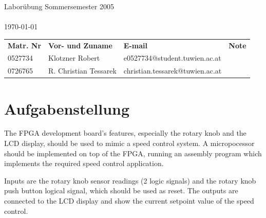 \documentclass[a4paper,10pt]{scrartcl}
\begin{document}
\begin{titlepage}
\begin{center}
\begin{Large}

\sffamily \vspace*{\fill}{Institut f\"ur Computertechnik\\
Labor integrierte Schaltungen\\
384.088\\}
\vfill { Labor\"ubung Sommersemester 2005\\}
\vspace{10mm}{Betreuer: Herr Nachtnebel}\\
\today\\
\end{Large}
\vfill

\begin{tabular}{llll}
\textbf{Matr. Nr} & \textbf{Vor- und Zuname} & \textbf{E-mail} & \textbf{Note} \\
0527734 & Klotzner Robert & e0527734@student.tuwien.ac.at &  \\
0726765 & R. Christian Tessarek & christian.tessarek@tuwien.ac.at &
\end{tabular}

\end{center}
\end{titlepage}



\pagebreak
\tableofcontents
\pagebreak


\section{Aufgabenstellung}
\label{sec:aufgabe}


The FPGA development board's features, especially the rotary knob and the LCD display, should be used to mimic a speed control system. 
A micropocessor should be implemented on top of the FPGA, running an assembly program which implements the required speed control application. 

Inputs are the rotary knob sensor readings (2 logic signals) and the rotary knob push button logical signal, which should be used as reset. 
The outputs are connected to the LCD display and show the current setpoint value of the speed control. 
\end{document}
